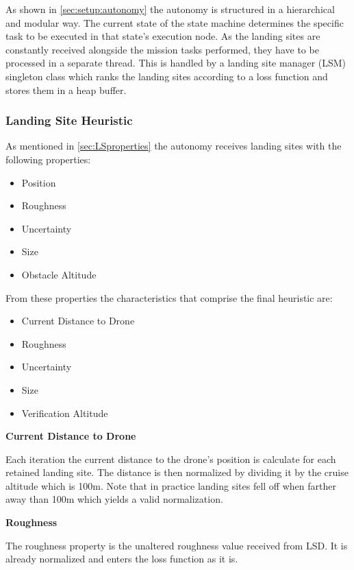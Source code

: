 As shown in \cref{sec:setup:autonomy} the autonomy is structured in a hierarchical and modular way. The current state of the state machine determines the specific task to be executed in that state's execution node. As the landing sites are constantly received alongside the mission tasks performed, they have to be processed in a separate thread. This is handled by a landing site manager (LSM) singleton class which ranks the landing sites according to a loss function and stores them in a heap buffer.

\subsubsection{Landing Site Heuristic}\label{subsubsec:LandingSiteHeuristic}

As mentioned in \cref{sec:LSproperties} the autonomy receives landing sites with the following properties:

\begin{itemize}
    \item Position
    \item Roughness
    \item Uncertainty
    \item Size
    \item Obstacle Altitude
\end{itemize}

From these properties the characteristics that comprise the final heuristic are:

\begin{itemize}
    \item Current Distance to Drone
    \item Roughness
    \item Uncertainty
    \item Size
    \item Verification Altitude
\end{itemize}

\textbf{Current Distance to Drone}

Each iteration the current distance to the drone's position is calculate for each retained landing site. The distance is then normalized by dividing it by the cruise altitude which is 100m. Note that in practice landing sites fell off when farther away than 100m which yields a valid normalization. %
\clearpage

\textbf{Roughness}

The roughness property is the unaltered roughness value received from LSD. It is already normalized and enters the loss function as it is. 

